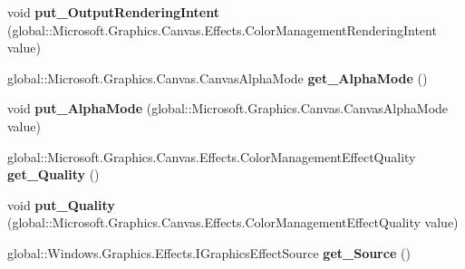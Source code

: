 \begin{DoxyCompactItemize}
void {\bfseries put\+\_\+\+Output\+Rendering\+Intent} (global\+::\+Microsoft.\+Graphics.\+Canvas.\+Effects.\+Color\+Management\+Rendering\+Intent value)
\item 
\mbox{\label{interface_microsoft_1_1_graphics_1_1_canvas_1_1_effects_1_1_i_color_management_effect_a7d4117ceb7538a6087fe55cec1fe1dae}} 
global\+::\+Microsoft.\+Graphics.\+Canvas.\+Canvas\+Alpha\+Mode {\bfseries get\+\_\+\+Alpha\+Mode} ()
\item 
\mbox{\label{interface_microsoft_1_1_graphics_1_1_canvas_1_1_effects_1_1_i_color_management_effect_af51f08ac38859f62bfa6854da45d846e}} 
void {\bfseries put\+\_\+\+Alpha\+Mode} (global\+::\+Microsoft.\+Graphics.\+Canvas.\+Canvas\+Alpha\+Mode value)
\item 
\mbox{\label{interface_microsoft_1_1_graphics_1_1_canvas_1_1_effects_1_1_i_color_management_effect_a89c6320a78dd9ee2ea791a82ba659f20}} 
global\+::\+Microsoft.\+Graphics.\+Canvas.\+Effects.\+Color\+Management\+Effect\+Quality {\bfseries get\+\_\+\+Quality} ()
\item 
\mbox{\label{interface_microsoft_1_1_graphics_1_1_canvas_1_1_effects_1_1_i_color_management_effect_a447e32036c75c68edbb85d92ede18c3b}} 
void {\bfseries put\+\_\+\+Quality} (global\+::\+Microsoft.\+Graphics.\+Canvas.\+Effects.\+Color\+Management\+Effect\+Quality value)
\item 
\mbox{\label{interface_microsoft_1_1_graphics_1_1_canvas_1_1_effects_1_1_i_color_management_effect_a836413a00b466fca673e824579e980b1}} 
global\+::\+Windows.\+Graphics.\+Effects.\+I\+Graphics\+Effect\+Source {\bfseries get\+\_\+\+Source} ()
\item 
\mbox{\label{interface_microsoft_1_1_graphics_1_1_canvas_1_1_effects_1_1_i_color_management_effect_a606468f964e7f248f59152b490d12d58}} 

\end{DoxyCompactItemize}
